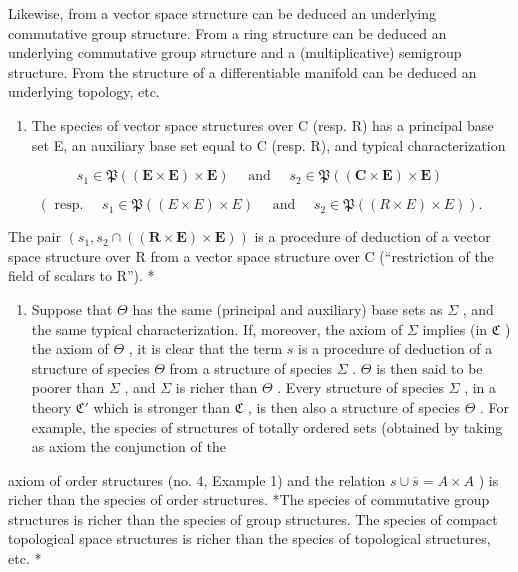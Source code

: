 Likewise, from a vector space structure can be deduced an underlying commutative group structure. From a ring structure can be deduced an underlying commutative group structure and a (multiplicative) semigroup structure. From the structure of a differentiable manifold can be deduced an underlying topology, etc.

\begin{enumerate}
\def\labelenumi{(\arabic{enumi})}
\setcounter{enumi}{1}
\tightlist
\item
  The species of vector space structures over C (resp. R) has a principal base set E, an auxiliary base set equal to C (resp. R), and typical characterization
\end{enumerate}

\[
s _ {1} \in \mathfrak {P} ((\mathbf {E} \times \mathbf {E}) \times \mathbf {E}) \quad \text { and } \quad s _ {2} \in \mathfrak {P} ((\mathbf {C} \times \mathbf {E}) \times \mathbf {E})
\]

\[
(\text { resp. } \quad s _ {1} \in \mathfrak {P} ((E \times E) \times E) \quad \text { and } \quad s _ {2} \in \mathfrak {P} ((R \times E) \times E)).
\]

The pair \((s_{1}, s_{2} \cap ((\mathbf{R} \times \mathbf{E}) \times \mathbf{E}))\) is a procedure of deduction of a vector space structure over R from a vector space structure over C (``restriction of the field of scalars to R''). *

\begin{enumerate}
\def\labelenumi{(\arabic{enumi})}
\setcounter{enumi}{2}
\tightlist
\item
  Suppose that \(\Theta\) has the same (principal and auxiliary) base sets as \(\Sigma\) , and the same typical characterization. If, moreover, the axiom of \(\Sigma\) implies (in \(\mathfrak{C}\) ) the axiom of \(\Theta\) , it is clear that the term \(s\) is a procedure of deduction of a structure of species \(\Theta\) from a structure of species \(\Sigma\) . \(\Theta\) is then said to be poorer than \(\Sigma\) , and \(\Sigma\) is richer than \(\Theta\) . Every structure of species \(\Sigma\) , in a theory \(\mathfrak{C}'\) which is stronger than \(\mathfrak{C}\) , is then also a structure of species \(\Theta\) . For example, the species of structures of totally ordered sets (obtained by taking as axiom the conjunction of the
\end{enumerate}

axiom of order structures (no. 4, Example 1) and the relation \(s \cup \overline{s} = A \times A\) ) is richer than the species of order structures. *The species of commutative group structures is richer than the species of group structures. The species of compact topological space structures is richer than the species of topological structures, etc. *

